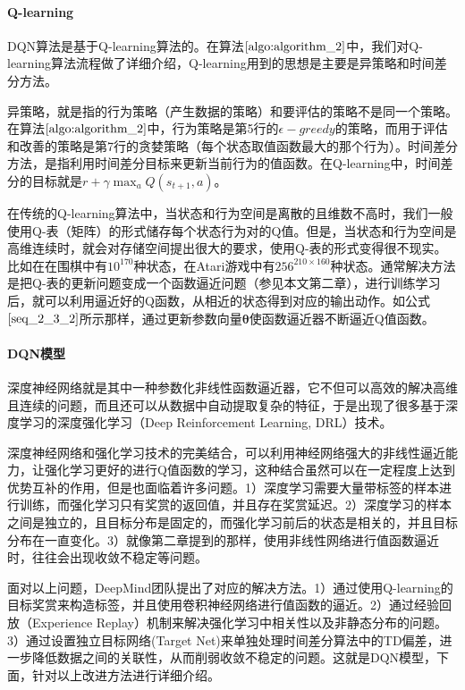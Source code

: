  \paragraph{Q-learning}
 DQN算法是基于Q-learning算法的。在算法$\ref{algo:algorithm_2}$中，我们对Q-learning算法流程做了详细介绍，Q-learning用到的思想是主要是异策略和时间差分方法。

异策略，就是指的行为策略（产生数据的策略）和要评估的策略不是同一个策略。在算法$\ref{algo:algorithm_2}$中，行为策略是第5行的$\epsilon-greedy$的策略，而用于评估和改善的策略是第7行的贪婪策略（每个状态取值函数最大的那个行为）。时间差分方法，是指利用时间差分目标来更新当前行为的值函数。在Q-learning中，时间差分的目标就是$r+\gamma \max_{a} Q(s_{t+1},a)$。

在传统的Q-learning算法中，当状态和行为空间是离散的且维数不高时，我们一般使用Q-表（矩阵）的形式储存每个状态行为对的Q值。但是，当状态和行为空间是高维连续时，就会对存储空间提出很大的要求，使用Q-表的形式变得很不现实。比如在在围棋中有$10^{170}$种状态，在Atari游戏中有$256^{210\times160}$种状态。通常解决方法是把Q-表的更新问题变成一个函数逼近问题（参见本文第二章），进行训练学习后，就可以利用逼近好的Q函数，从相近的状态得到对应的输出动作。如公式$\eqref{seq_2_3_2}$所示那样，通过更新参数向量$\bm{\theta}$使函数逼近器不断逼近Q值函数。

 \paragraph{DQN模型}
深度神经网络就是其中一种参数化非线性函数逼近器，它不但可以高效的解决高维且连续的问题，而且还可以从数据中自动提取复杂的特征，于是出现了很多基于深度学习的深度强化学习（Deep Reinforcement Learning, DRL）技术。

深度神经网络和强化学习技术的完美结合，可以利用神经网络强大的非线性逼近能力，让强化学习更好的进行Q值函数的学习，这种结合虽然可以在一定程度上达到优势互补的作用，但是也面临着许多问题。1）深度学习需要大量带标签的样本进行训练，而强化学习只有奖赏的返回值，并且存在奖赏延迟。2）深度学习的样本之间是独立的，且目标分布是固定的，而强化学习前后的状态是相关的，并且目标分布在一直变化。3）就像第二章提到的那样，使用非线性网络进行值函数逼近时，往往会出现收敛不稳定等问题。

面对以上问题，DeepMind团队提出了对应的解决方法。1）通过使用Q-learning的目标奖赏来构造标签，并且使用卷积神经网络进行值函数的逼近。2）通过经验回放（Experience Replay）机制来解决强化学习中相关性以及非静态分布的问题。3）通过设置独立目标网络(Target Net)来单独处理时间差分算法中的TD偏差，进一步降低数据之间的关联性，从而削弱收敛不稳定的问题。这就是DQN模型，下面，针对以上改进方法进行详细介绍。

